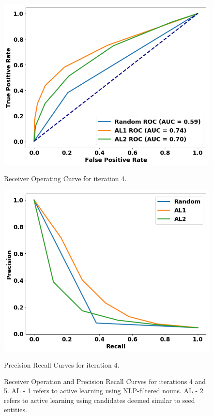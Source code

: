 \begin{figure}
\centering
\begin{minipage}[b]{.4\textwidth}
\includegraphics[trim=0in 0.1in 0.1in 0.in,clip,width=1.0\textwidth]{figures/rocs_round5.png}
\captionsetup{labelformat=empty}
\caption{Receiver Operating Curve for iteration 4.}\label{fig:rocs_round5}
\end{minipage}\qquad
\begin{minipage}[b]{.4\textwidth}
\includegraphics[trim=0in 0.1in 0.1in 0.in,clip,width=1.0\textwidth]{figures/prcs_round5.png}
\captionsetup{labelformat=empty}
\caption{Precision Recall Curves for iteration 4.}\label{fig:prcs_round5}
\end{minipage}
\setcounter{figure}{8}  
\caption{Receiver Operation and Precision Recall Curves for iterations 4 and 5. AL - 1 refers to active learning using NLP-filtered nouns. AL - 2 refers to active learning using candidates deemed similar to seed entities.}\label{fig:rocs_prcs_round5}
\end{figure}

